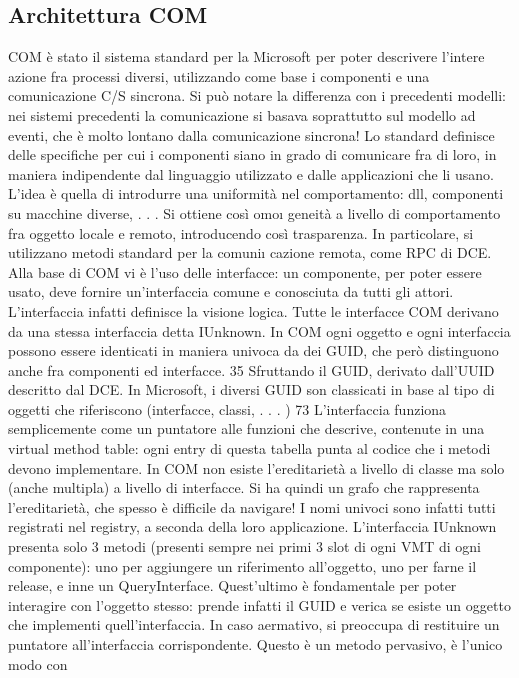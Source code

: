 \subsection{Architettura COM}
COM è stato il sistema standard per la Microsoft per poter descrivere l'intere
azione fra processi diversi, utilizzando come base i componenti e una comunicazione C/S sincrona. Si può notare la
differenza con i precedenti modelli: nei
sistemi precedenti la comunicazione si basava soprattutto sul modello ad eventi,
che è molto lontano dalla comunicazione sincrona!
Lo standard definisce delle specifiche per cui i componenti siano in grado
di comunicare fra di loro, in maniera indipendente dal linguaggio utilizzato e
dalle applicazioni che li usano. L'idea è quella di introdurre una uniformità nel
comportamento: dll, componenti su macchine diverse, . . . Si ottiene così omo\i{}
geneità a livello di comportamento fra oggetto locale e remoto, introducendo
così trasparenza. In particolare, si utilizzano metodi standard per la comuni\i{}
cazione remota, come RPC di DCE.
Alla base di COM vi è l'uso delle interfacce: un componente, per poter
essere usato, deve fornire un'interfaccia comune e conosciuta da tutti gli attori. L'interfaccia infatti definisce la
visione logica. Tutte le interfacce COM
derivano da una stessa interfaccia detta IUnknown. In COM ogni oggetto e ogni
interfaccia possono essere identicati in maniera univoca da dei GUID, che però
distinguono anche fra componenti ed interfacce.
35 Sfruttando il GUID, derivato dall'UUID descritto dal DCE. In Microsoft, i diversi GUID
son classicati in base al tipo di oggetti che riferiscono (interfacce, classi, . . . )
73
L'interfaccia funziona semplicemente come un puntatore alle funzioni che descrive, contenute in una virtual method
table: ogni entry di questa tabella punta
al codice che i metodi devono implementare. In COM non esiste l'ereditarietà
a livello di classe ma solo (anche multipla) a livello di interfacce. Si ha quindi
un grafo che rappresenta l'ereditarietà, che spesso è difficile da navigare! I nomi
univoci sono infatti tutti registrati nel registry, a seconda della loro applicazione.
L'interfaccia IUnknown presenta solo 3 metodi (presenti sempre nei primi
3 slot di ogni VMT di ogni componente): uno per aggiungere un riferimento
all'oggetto, uno per farne il release, e inne un QueryInterface. Quest'ultimo è
fondamentale per poter interagire con l'oggetto stesso: prende infatti il GUID e
verica se esiste un oggetto che implementi quell'interfaccia. In caso aermativo,
si preoccupa di restituire un puntatore all'interfaccia corrispondente. Questo è un metodo pervasivo, è l'unico modo con
